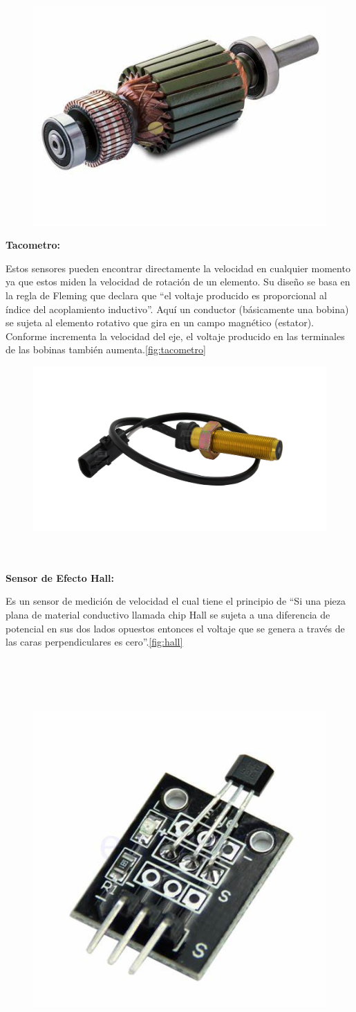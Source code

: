 \begin{figure}[h]
	\centering
	\includegraphics[width=0.2\linewidth, height=0.2\textheight]{img/OIP}
	\caption{}
	\label{fig:oip}
\end{figure}

\textbf{Tacometro:}

Estos sensores pueden encontrar directamente la velocidad en cualquier momento ya que estos miden la velocidad de rotación de un elemento. Su diseño se basa en la regla de Fleming que declara que “el voltaje producido es proporcional al índice del acoplamiento inductivo”. Aquí un conductor (básicamente una bobina) se sujeta al elemento rotativo que gira en un campo magnético (estator). Conforme incrementa la velocidad del eje, el voltaje producido en las terminales de las bobinas también aumenta.\autoref{fig:tacometro}


\begin{figure}[h]
	\centering
	\includegraphics[width=0.5\linewidth, height=0.3\textheight]{img/tacometro}
	\caption[Tacometro]{}
	\label{fig:tacometro}
\end{figure}

\textbf{}\\\\
\textbf{Sensor de Efecto Hall:}

Es un sensor de medición de velocidad el cual tiene el principio de “Si una pieza plana de material conductivo llamada chip Hall se sujeta a una diferencia de potencial en sus dos lados opuestos entonces el voltaje que se genera a través de las caras perpendiculares es cero”.\autoref{fig:hall}\\\\\\\\\\


\begin{figure}[h]
	\centering
	\includegraphics[width=0.2\linewidth, height=0.2\textheight]{img/HALL}
	\caption{}
	\label{fig:hall}
\end{figure}




